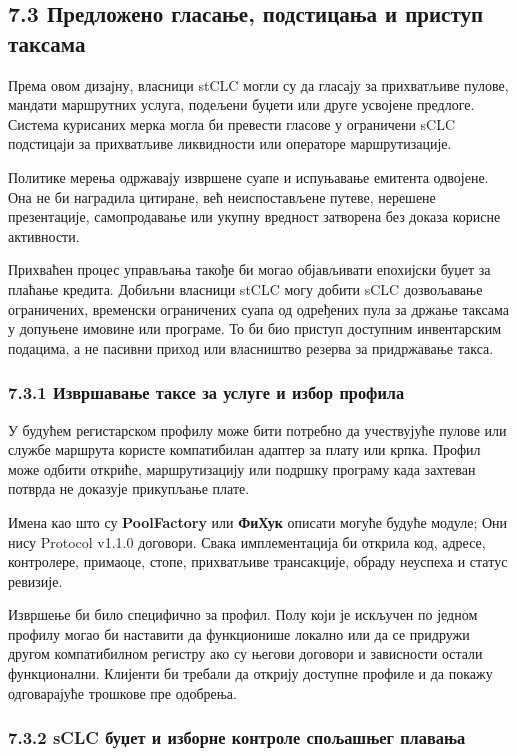 \documentclass[11pt]{article}
\begin{document}
\subsection*{7.3 Предложено гласање, подстицања и приступ таксама}

Према овом дизајну, власници stCLC могли су да гласају за прихватљиве пулове, мандати маршрутних услуга, подељени буџети или друге усвојене предлоге. Система курисаних мерка могла би превести гласове у ограничени sCLC подстицаји за прихватљиве ликвидности или операторе маршрутизације.

Политике мерења одржавају извршене суапе и испуњавање емитента одвојене. Она не би наградила цитиране, већ неиспостављене путеве, нерешене презентације, самопродавање или укупну вредност затворена без доказа корисне активности.

Прихваћен процес управљања такође би могао објављивати епохијски буџет за плаћање кредита. Добиљни власници stCLC могу добити sCLC дозвољавање ограничених, временски ограничених суапа од одређених пула за држање таксама у допуњене имовине или програме. То би био приступ доступним инвентарским подацима, а не пасивни приход или власништво резерва за придржавање такса.

\subsubsection*{7.3.1 Извршавање таксе за услуге и избор профила}

У будућем регистарском профилу може бити потребно да учествујуће пулове или службе маршрута користе компатибилан адаптер за плату или крпка. Профил може одбити откриће, маршрутизацију или подршку програму када захтеван потврда не доказује прикупљање плате.

Имена као што су \textbf{PoolFactory } или \textbf{ ФиХук} описати могуће будуће модуле; Они нису Protocol v1.1.0 договори. Свака имплементација би открила код, адресе, контролере, примаоце, стопе, прихватљиве трансакције, обраду неуспеха и статус ревизије.

Извршење би било специфично за профил. Полу који је искључен по једном профилу могао би наставити да функционише локално или да се придружи другом компатибилном регистру ако су његови договори и зависности остали функционални. Клијенти би требали да открију доступне профиле и да покажу одговарајуће трошкове пре одобрења.

\subsubsection*{7.3.2 sCLC буџет и изборне контроле спољашњег плавања}
\end{document}
